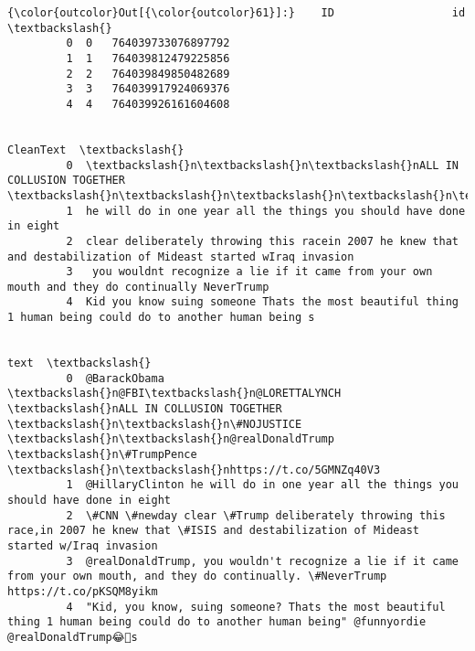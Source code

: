 \documentclass[11pt]{article}
\begin{document}
\begin{Verbatim}[commandchars=\\\{\}]
{\color{outcolor}Out[{\color{outcolor}61}]:}    ID                  id  \textbackslash{}
         0  0   764039733076897792   
         1  1   764039812479225856   
         2  2   764039849850482689   
         3  3   764039917924069376   
         4  4   764039926161604608   
         
                                                                                                                  CleanText  \textbackslash{}
         0  \textbackslash{}n\textbackslash{}n\textbackslash{}nALL IN COLLUSION TOGETHER \textbackslash{}n\textbackslash{}n\textbackslash{}n\textbackslash{}n\textbackslash{}n\textbackslash{}n\textbackslash{}nhttpstco5GMNZq40V3                                                  
         1  he will do in one year all the things you should have done in eight                                               
         2  clear deliberately throwing this racein 2007 he knew that and destabilization of Mideast started wIraq invasion   
         3   you wouldnt recognize a lie if it came from your own mouth and they do continually NeverTrump                    
         4  Kid you know suing someone Thats the most beautiful thing 1 human being could do to another human being s         
         
                                                                                                                                                    text  \textbackslash{}
         0  @BarackObama \textbackslash{}n@FBI\textbackslash{}n@LORETTALYNCH \textbackslash{}nALL IN COLLUSION TOGETHER \textbackslash{}n\textbackslash{}n\#NOJUSTICE \textbackslash{}n\textbackslash{}n@realDonaldTrump \textbackslash{}n\#TrumpPence \textbackslash{}n\textbackslash{}nhttps://t.co/5GMNZq40V3   
         1  @HillaryClinton he will do in one year all the things you should have done in eight                                                            
         2  \#CNN \#newday clear \#Trump deliberately throwing this race,in 2007 he knew that \#ISIS and destabilization of Mideast started w/Iraq invasion    
         3  @realDonaldTrump, you wouldn't recognize a lie if it came from your own mouth, and they do continually. \#NeverTrump https://t.co/pKSQM8yikm    
         4  "Kid, you know, suing someone? Thats the most beautiful thing 1 human being could do to another human being" @funnyordie @realDonaldTrump😂💩s   
         

\end{Verbatim}
\end{document}
